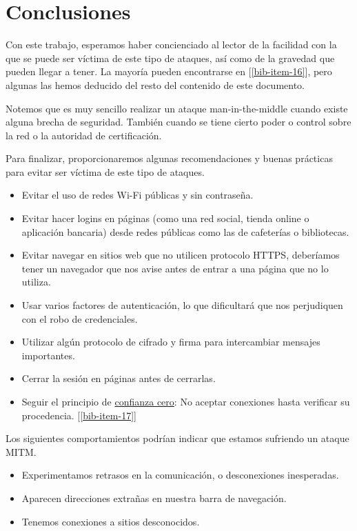 \documentclass[11pt]{article}
\begin{document}
\section{Conclusiones}

Con este trabajo, esperamos haber concienciado al lector de la facilidad con la que se puede ser víctima de este tipo de ataques, así como
de la gravedad que pueden llegar a tener. La mayoría pueden encontrarse en [\ref{bib-item-16}], pero algunas las hemos deducido
del resto del contenido de este documento.

Notemos que es muy sencillo realizar un ataque man-in-the-middle cuando existe alguna brecha de seguridad. También cuando se tiene cierto poder
o control sobre la red o la autoridad de certificación.

Para finalizar, proporcionaremos algunas recomendaciones y buenas prácticas para evitar ser víctima de este tipo de ataques.
\begin{itemize}
	\item Evitar el uso de redes Wi-Fi públicas y sin contraseña.
	\item Evitar hacer logins en páginas (como una red social, tienda online o aplicación bancaria) desde redes públicas como las de cafeterías
	o bibliotecas.
	\item Evitar navegar en sitios web que no utilicen protocolo HTTPS, deberíamos tener un navegador que nos avise antes de entrar a una página que
	no lo utiliza.
	\item Usar varios factores de autenticación, lo que dificultará que nos perjudiquen con el robo de credenciales.
	\item Utilizar algún protocolo de cifrado y firma para intercambiar mensajes importantes.
	\item Cerrar la sesión en páginas antes de cerrarlas.
	\item Seguir el principio de \href{https://www.csoonline.com/article/3247848/what-is-zero-trust-a-model-for-more-effective-security.html}{confianza cero}: No aceptar conexiones hasta verificar su procedencia. [\ref{bib-item-17}]
\end{itemize}

Los siguientes comportamientos podrían indicar que estamos sufriendo un ataque MITM.
\begin{itemize}
	\item Experimentamos retrasos en la comunicación, o desconexiones inesperadas.
	\item Aparecen direcciones extrañas en nuestra barra de navegación.
	\item Tenemos conexiones a sitios desconocidos.
\end{itemize}
\end{document}
